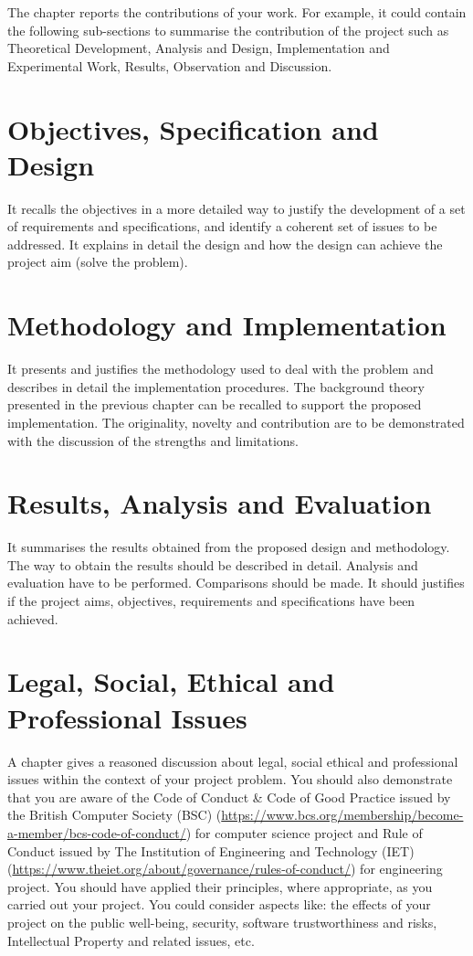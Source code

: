 
The chapter reports the contributions of your work.  For example, it could contain the following sub-sections to summarise the contribution of the project such as Theoretical Development, Analysis and Design, Implementation and Experimental Work, Results, Observation and Discussion.

\section{Objectives, Specification and Design}

	It recalls the objectives in a more detailed way to justify the development of a set of requirements and specifications, and identify a coherent set of issues to be addressed. It explains in detail the design and how the design can achieve the project aim (solve the problem).

\section{Methodology and Implementation}

	It presents and justifies the methodology used to deal with the problem and describes in detail the implementation procedures. The background theory presented in the previous chapter can be recalled to support the proposed implementation. The originality, novelty and contribution are to be demonstrated with the discussion of the strengths and limitations.

\section{Results, Analysis and Evaluation}
	It summarises the results obtained from the proposed design and methodology. The way to obtain the results should be described in detail. Analysis and evaluation have to be performed. Comparisons should be made. It should justifies if the project aims, objectives, requirements and specifications have been achieved.

\section{Legal, Social, Ethical and Professional Issues}
	A chapter gives a reasoned discussion about legal, social ethical and professional issues within the context of your project problem. You should also demonstrate that you are aware of the Code of Conduct \& Code of Good Practice issued by the British Computer Society (BSC) (\url{https://www.bcs.org/membership/become-a-member/bcs-code-of-conduct/}) for computer science project and Rule of Conduct issued by The Institution of Engineering and Technology (IET) (\url{https://www.theiet.org/about/governance/rules-of-conduct/}) for engineering project.  You should have applied their principles, where appropriate, as you carried out your project. You could consider aspects like: the effects of your project on the public well-being, security, software trustworthiness and risks, Intellectual Property and related issues, etc.


